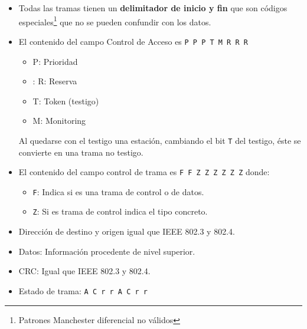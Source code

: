 \documentclass[10pt,portrait, twocolumn]{article}
\begin{document}
\begin{itemize}
\item Todas las tramas tienen un \textbf{delimitador de inicio y fin} que son códigos especiales\footnote{Patrones Manchester diferencial no válidos} que no se pueden confundir con los datos.\\
	
\item El contenido del campo Control de Acceso es \texttt{P P P T M R R R}

	\begin{itemize}
	\item P: Prioridad
	\item: R: Reserva
	\item T: Token (testigo)
	\item M: Monitoring
	\end{itemize}
	
Al quedarse con el testigo una estación, cambiando el bit \texttt{T} del testigo, éste se convierte en una trama no testigo.\\

\item El contenido del campo control de trama es \texttt{F F Z Z Z Z Z Z} donde:

	\begin{itemize}
	\item \texttt{F}: Indica si es una trama de control o de datos.
	\item \texttt{Z}: Si es trama de control indica el tipo concreto.
	\end{itemize}
	
\item Dirección de destino y origen igual que IEEE 802.3 y 802.4.
\item Datos: Información procedente de nivel superior.
\item CRC: Igual que IEEE 802.3 y 802.4.
\item Estado de trama: \texttt{A C r r A C r r}


\end{itemize}
\end{document}
